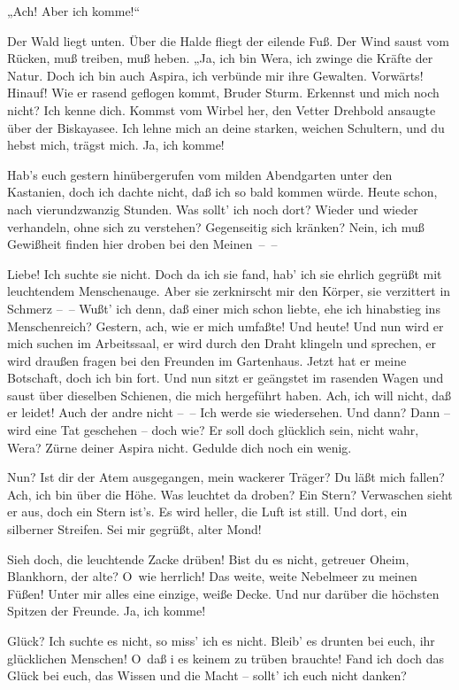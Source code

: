 „Ach! Aber ich komme!“

Der Wald liegt unten. Über die Halde fliegt der eilende Fuß. Der
Wind saust vom Rücken, muß treiben, muß heben. „Ja, ich bin Wera,
ich zwinge die Kräfte der Natur. Doch ich bin auch Aspira, ich
verbünde mir ihre Gewalten. Vorwärts! Hinauf! Wie er rasend
geflogen kommt, Bruder Sturm. Erkennst und mich noch nicht? Ich
kenne dich. Kommst vom Wirbel her, den Vetter Drehbold ansaugte
über der Biskayasee. Ich lehne mich an deine starken, weichen
Schultern, und du hebst mich, trägst mich. Ja, ich komme!

Hab's euch gestern hinübergerufen vom milden Abendgarten unter den
Kastanien, doch ich dachte nicht, daß ich so bald kommen würde.
Heute schon, nach vierundzwanzig Stunden. Was sollt' ich noch dort?
Wieder und wieder verhandeln, ohne sich zu verstehen? Gegenseitig
sich kränken? Nein, ich muß Gewißheit finden hier droben bei den
Meinen~–~–

Liebe! Ich suchte sie nicht. Doch da ich sie fand, hab' ich sie
ehrlich gegrüßt mit leuchtendem Menschenauge. Aber sie zerknirscht
mir den Körper, sie verzittert in Schmerz –~– Wußt' ich denn, daß
einer mich schon liebte, ehe ich hinabstieg ins Menschenreich?
Gestern, ach, wie er mich umfaßte! Und heute! Und nun wird er mich
suchen im Arbeitssaal, er wird durch den Draht klingeln und
sprechen, er wird draußen fragen bei den Freunden im Gartenhaus.
Jetzt hat er meine Botschaft, doch ich bin fort. Und nun sitzt er
geängstet im rasenden Wagen und saust über dieselben Schienen, die
mich hergeführt haben. Ach, ich will nicht, daß er leidet! Auch der
andre nicht –~– Ich werde sie wiedersehen. Und dann? Dann – wird
eine Tat geschehen – doch wie? Er soll doch glücklich sein, nicht
wahr, Wera? Zürne deiner Aspira nicht. Gedulde dich noch ein
wenig.

Nun? Ist dir der Atem ausgegangen, mein wackerer Träger? Du läßt
mich fallen? Ach, ich bin über die Höhe. Was leuchtet da droben?
Ein Stern? Verwaschen sieht er aus, doch ein Stern ist's. Es wird
heller, die Luft ist still. Und dort, ein silberner Streifen. Sei
mir gegrüßt, alter Mond!

Sieh doch, die leuchtende Zacke drüben! Bist du es nicht, getreuer
Oheim, Blankhorn, der alte? O~wie herrlich! Das weite, weite
Nebelmeer zu meinen Füßen! Unter mir alles eine einzige, weiße
Decke. Und nur darüber die höchsten Spitzen der Freunde. Ja, ich
komme!

Glück? Ich suchte es nicht, so miss' ich es nicht. Bleib' es
drunten bei euch, ihr glücklichen Menschen! O~daß i es keinem zu
trüben brauchte! Fand ich doch das Glück bei euch, das Wissen und
die Macht – sollt' ich euch nicht danken?

